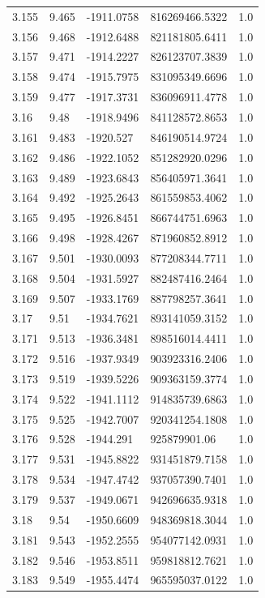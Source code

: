 \begin{tabular}{lllll}
3.155 & 9.465 & -1911.0758 & 816269466.5322 & 1.0 \\
3.156 & 9.468 & -1912.6488 & 821181805.6411 & 1.0 \\
3.157 & 9.471 & -1914.2227 & 826123707.3839 & 1.0 \\
3.158 & 9.474 & -1915.7975 & 831095349.6696 & 1.0 \\
3.159 & 9.477 & -1917.3731 & 836096911.4778 & 1.0 \\
3.16 & 9.48 & -1918.9496 & 841128572.8653 & 1.0 \\
3.161 & 9.483 & -1920.527 & 846190514.9724 & 1.0 \\
3.162 & 9.486 & -1922.1052 & 851282920.0296 & 1.0 \\
3.163 & 9.489 & -1923.6843 & 856405971.3641 & 1.0 \\
3.164 & 9.492 & -1925.2643 & 861559853.4062 & 1.0 \\
3.165 & 9.495 & -1926.8451 & 866744751.6963 & 1.0 \\
3.166 & 9.498 & -1928.4267 & 871960852.8912 & 1.0 \\
3.167 & 9.501 & -1930.0093 & 877208344.7711 & 1.0 \\
3.168 & 9.504 & -1931.5927 & 882487416.2464 & 1.0 \\
3.169 & 9.507 & -1933.1769 & 887798257.3641 & 1.0 \\
3.17 & 9.51 & -1934.7621 & 893141059.3152 & 1.0 \\
3.171 & 9.513 & -1936.3481 & 898516014.4411 & 1.0 \\
3.172 & 9.516 & -1937.9349 & 903923316.2406 & 1.0 \\
3.173 & 9.519 & -1939.5226 & 909363159.3774 & 1.0 \\
3.174 & 9.522 & -1941.1112 & 914835739.6863 & 1.0 \\
3.175 & 9.525 & -1942.7007 & 920341254.1808 & 1.0 \\
3.176 & 9.528 & -1944.291 & 925879901.06 & 1.0 \\
3.177 & 9.531 & -1945.8822 & 931451879.7158 & 1.0 \\
3.178 & 9.534 & -1947.4742 & 937057390.7401 & 1.0 \\
3.179 & 9.537 & -1949.0671 & 942696635.9318 & 1.0 \\
3.18 & 9.54 & -1950.6609 & 948369818.3044 & 1.0 \\
3.181 & 9.543 & -1952.2555 & 954077142.0931 & 1.0 \\
3.182 & 9.546 & -1953.8511 & 959818812.7621 & 1.0 \\
3.183 & 9.549 & -1955.4474 & 965595037.0122 & 1.0 \\

\end{tabular}
